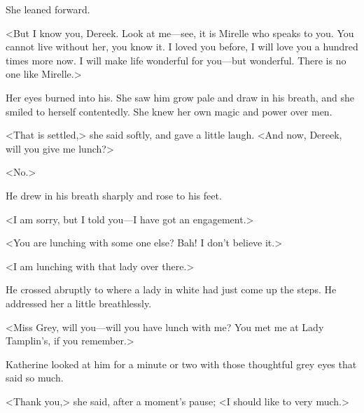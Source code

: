 She leaned forward.

<But I know you, Dereek. Look at me—see, it is Mirelle who speaks to you. You cannot live without her, you know it. I loved you before, I will love you a hundred times more now. I will make life wonderful for you—but wonderful. There is no one like Mirelle.>

Her eyes burned into his. She saw him grow pale and draw in his breath, and she smiled to herself contentedly. She knew her own magic and power over men.

<That is settled,> she said softly, and gave a little laugh. <And now, Dereek, will you give me lunch?>

<No.>

He drew in his breath sharply and rose to his feet.

<I am sorry, but I told you—I have got an engagement.>

<You are lunching with some one else? Bah! I don't believe it.>

<I am lunching with that lady over there.>

He crossed abruptly to where a lady in white had just come up the steps. He addressed her a little breathlessly.

<Miss Grey, will you—will you have lunch with me? You met me at Lady Tamplin's, if you remember.>

Katherine looked at him for a minute or two with those thoughtful grey eyes that said so much.

<Thank you,> she said, after a moment's pause; <I should like to very much.>